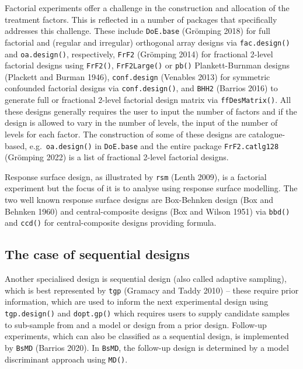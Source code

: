 \documentclass{article}
\begin{document}
Factorial experiments offer a challenge in the construction and
allocation of the treatment factors. This is reflected in a number of
packages that specifically addresses this challenge. These include
\texttt{DoE.base} (Grömping 2018) for full factorial and (regular and
irregular) orthogonal array designs via \texttt{fac.design()} and
\texttt{oa.design()}, respectively, \texttt{FrF2} (Grömping 2014) for
fractional 2-level factorial designs using \texttt{FrF2()},
\texttt{FrF2Large()} or \texttt{pb()} Plankett-Burnman designs (Plackett
and Burman 1946), \texttt{conf.design} (Venables 2013) for symmetric
confounded factorial designs via \texttt{conf.design()}, and
\texttt{BHH2} (Barrios 2016) to generate full or fractional 2-level
factorial design matrix via \texttt{ffDesMatrix()}. All these designs
generally requires the user to input the number of factors and if the
design is allowed to vary in the number of levels, the input of the
number of levels for each factor. The construction of some of these
designs are catalogue-based, e.g.~\texttt{oa.design()} in
\texttt{DoE.base} and the entire package \texttt{FrF2.catlg128}
(Grömping 2022) is a list of fractional 2-level factorial designs.

Response surface design, as illustrated by \texttt{rsm} (Lenth 2009), is
a factorial experiment but the focus of it is to analyse using response
surface modelling. The two well known response surface designs are
Box-Behnken design (Box and Behnken 1960) and central-composite designs
(Box and Wilson 1951) via \texttt{bbd()} and \texttt{ccd()} for
central-composite designs providing formula.

\hypertarget{the-case-of-sequential-designs}{%
\subsection{The case of sequential
designs}\label{the-case-of-sequential-designs}}

Another specialised design is sequential design (also called adaptive
sampling), which is best represented by \texttt{tgp} (Gramacy and Taddy
2010) -- these require prior information, which are used to inform the
next experimental design using \texttt{tgp.design()} and
\texttt{dopt.gp()} which requires users to supply candidate samples to
sub-sample from and a model or design from a prior design. Follow-up
experiments, which can also be classified as a sequential design, is
implemented by \texttt{BsMD} (Barrios 2020). In \texttt{BsMD}, the
follow-up design is determined by a model discriminant approach using
\texttt{MD()}.
\end{document}
